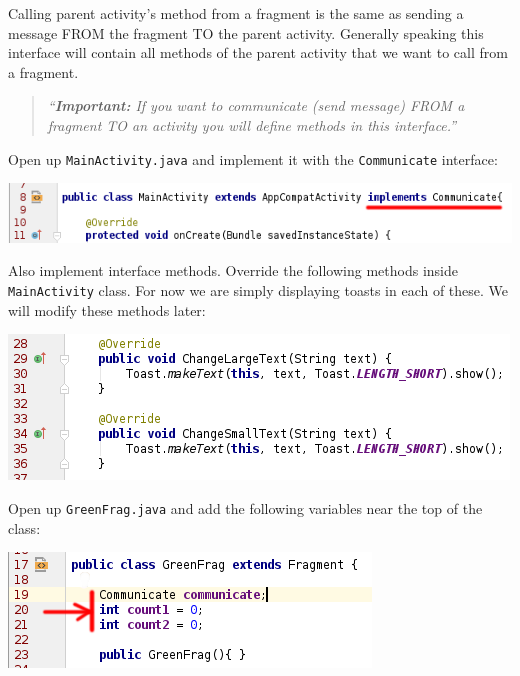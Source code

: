 Calling parent activity's method from a fragment is the same as sending a message FROM the fragment TO the parent activity. Generally speaking this interface will contain all methods of the parent activity that we want to call from a fragment. 

\begin{quote}
	\textit{``\textbf{Important:} If you want to communicate (send message) FROM a fragment TO an activity you will define methods in this interface.''}
\end{quote}


Open up \texttt{MainActivity.java} and implement it with the \texttt{Communicate} interface:

\begin{center}
	\includegraphics[scale=\SourceCodeScale]{chapters/ch11/images/26}
\end{center}

Also implement interface methods. Override the following methods inside \texttt{MainActivity} class. For now we are simply displaying toasts in each of these. We will modify these methods later:

\begin{center}
	\includegraphics[scale=\SourceCodeScale]{chapters/ch11/images/27}
\end{center}

Open up \texttt{GreenFrag.java} and add the following variables near the top of the class:

\begin{center}
	\includegraphics[scale=\SourceCodeScale]{chapters/ch11/images/28}
\end{center}

